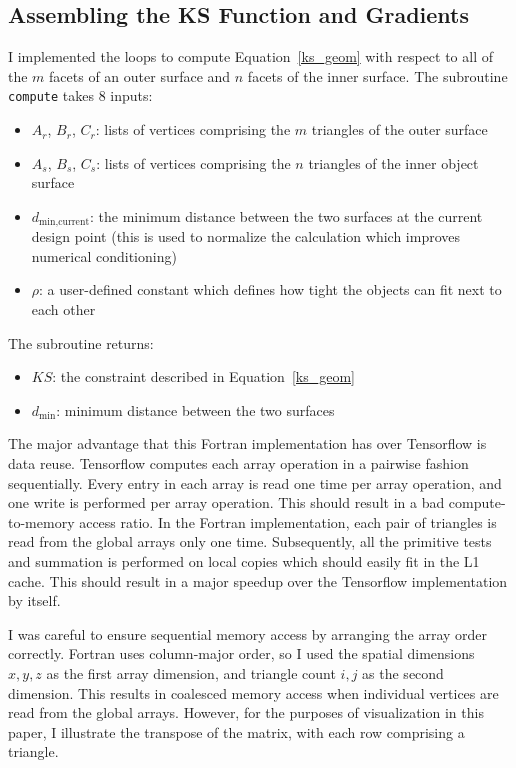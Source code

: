 \documentclass[11pt,letterpaper]{article}
\begin{document}
\subsection{Assembling the KS Function and Gradients}
\qquad I implemented the loops to compute Equation~\ref{ks_geom} with respect to all of the $m$ facets of an outer surface and $n$ facets of the inner surface.
The subroutine \texttt{compute} takes 8 inputs:

\begin{itemize}
  \item $A_r$, $B_r$, $C_r$: lists of vertices comprising the $m$ triangles of the outer surface
  \item $A_s$, $B_s$, $C_s$: lists of vertices comprising the $n$ triangles of the inner object surface
  \item $d_\text{min,current}$: the minimum distance between the two surfaces at the current design point (this is used to normalize the calculation which improves numerical conditioning)
  \item $\rho$: a user-defined constant which defines how tight the objects can fit next to each other
\end{itemize}

The subroutine returns:

\begin{itemize}
  \item $KS$: the constraint described in Equation~\ref{ks_geom}
  \item $d_\text{min}$: minimum distance between the two surfaces
\end{itemize}

The major advantage that this Fortran implementation has over Tensorflow is data reuse.
Tensorflow computes each array operation in a pairwise fashion sequentially.
Every entry in each array is read one time per array operation, and one write is performed per array operation.
This should result in a bad compute-to-memory access ratio.
In the Fortran implementation, each pair of triangles is read from the global arrays only one time.
Subsequently, all the primitive tests and summation is performed on local copies which should easily fit in the L1 cache.
This should result in a major speedup over the Tensorflow implementation by itself.

I was careful to ensure sequential memory access by arranging the array order correctly.
Fortran uses column-major order, so I used the spatial dimensions $x,y,z$ as the first array dimension, and triangle count $i,j$ as the second dimension.
This results in coalesced memory access when individual vertices are read from the global arrays.
However, for the purposes of visualization in this paper, I illustrate the transpose of the matrix, with each row comprising a triangle.
\end{document}
